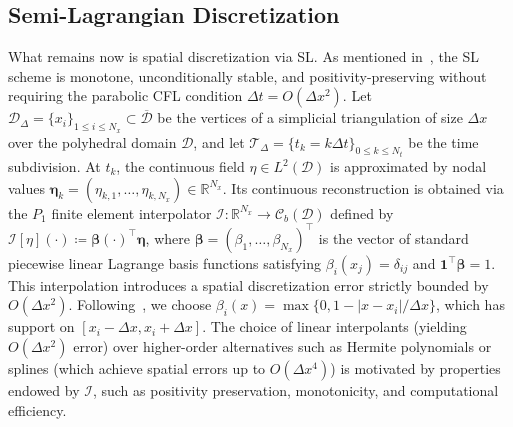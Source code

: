 \documentclass[10pt,a4paper]{article}
\begin{document}
\subsection{Semi-Lagrangian Discretization}
What remains now is spatial discretization via SL. As mentioned in~\cite{CalzolaCarliniDupuisSilva2023}, the SL scheme is monotone, unconditionally stable, and positivity-preserving without requiring the parabolic CFL condition $\Delta t = O(\Delta x^2)$. Let $\mathcal{D}_\Delta = \{x_i\}_{1 \leqslant i \leqslant N_x} \subset \overline{\mathcal{D}}$ be the vertices of a simplicial triangulation of size $\Delta x$ over the polyhedral domain $\mathcal{D}$, and let $\mathcal{T}_\Delta = \{t_k = k\Delta t\}_{0 \leqslant k \leqslant N_t}$ be the time subdivision. At $t_k$, the continuous field $\eta \in L^2(\mathcal{D})$ is approximated by nodal values $\boldsymbol{\eta}_k = (\eta_{k,1}, \dots, \eta_{k,N_x}) \in \mathbb{R}^{N_x}$. Its continuous reconstruction is obtained via the $P_1$ finite element interpolator $\mathcal{I} : \mathbb{R}^{N_x} \to \mathcal{C}_b(\mathcal{D})$ defined by $\mathcal{I}[\eta](\cdot) \coloneq \boldsymbol{\beta}(\cdot)^\top \boldsymbol{\eta}$, where $\boldsymbol{\beta} = (\beta_1, \dots, \beta_{N_x})^\top$ is the vector of standard piecewise linear Lagrange basis functions satisfying $\beta_i(x_j) = \delta_{ij}$ and $\mathbf{1}^\top \boldsymbol{\beta} = 1$. This interpolation introduces a spatial discretization error strictly bounded by $O(\Delta x^2)$. Following~\cite{CarliniSilva2013}, we choose $\beta_i(x) = \max\{0, 1 - |x - x_i|/\Delta x\}$, which has support on $[x_i - \Delta x, x_i + \Delta x]$. The choice of linear interpolants (yielding $O(\Delta x^2)$ error) over higher-order alternatives such as Hermite polynomials or splines (which achieve spatial errors up to $O(\Delta x^4)$) is motivated by properties endowed by $\mathcal{I}$, such as positivity preservation, monotonicity, and computational efficiency.%
\end{document}
